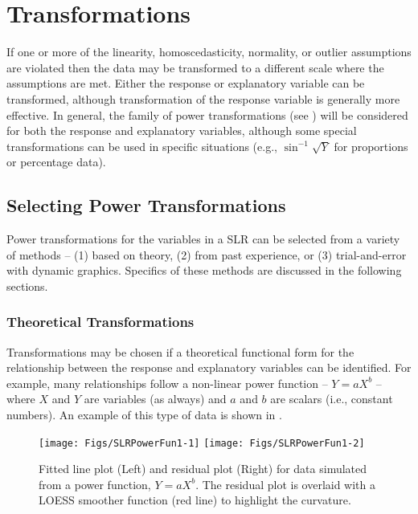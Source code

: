 \documentclass[10pt,openany]{book}\usepackage[]{graphicx}\usepackage[]{color}
\newenvironment{knitrout}{}{} %
\begin{document}
\section{Transformations} \label{sect:SLRTransformations}
If one or more of the linearity, homoscedasticity, normality, or outlier assumptions are violated then the data may be transformed to a different scale where the assumptions are met.  Either the response or explanatory variable can be transformed, although transformation of the response variable is generally more effective.  In general, the family of power transformations (see ) will be considered for both the response and explanatory variables, although some special transformations can be used in specific situations (e.g., $\sin^{-1}\sqrt{Y}$ for proportions or percentage data).


\subsection{Selecting Power Transformations}
Power transformations for the variables in a SLR can be selected from a variety of methods -- (1) based on theory, (2) from past experience, or (3) trial-and-error with dynamic graphics.  Specifics of these methods are discussed in the following sections.

\subsubsection*{Theoretical Transformations}
Transformations may be chosen if a theoretical functional form for the relationship between the response and explanatory variables can be identified.  For example, many relationships follow a non-linear power function -- $Y=aX^{b}$ -- where $X$ and $Y$ are variables (as always) and $a$ and $b$ are scalars (i.e., constant numbers).  An example of this type of data is shown in .

\begin{knitrout}
\color{fgcolor}\begin{figure}[h]

{\centering \texttt{[image: Figs/SLRPowerFun1-1]} 
\texttt{[image: Figs/SLRPowerFun1-2]} 

}

\caption[Fitted line plot (Left) and residual plot (Right) for data simulated from a power function, ]{Fitted line plot (Left) and residual plot (Right) for data simulated from a power function, $Y=aX^{b}$. The residual plot is overlaid with a LOESS smoother function (red line) to highlight the curvature.}\label{fig:SLRPowerFun1}
\end{figure}


\end{knitrout}
\end{document}

